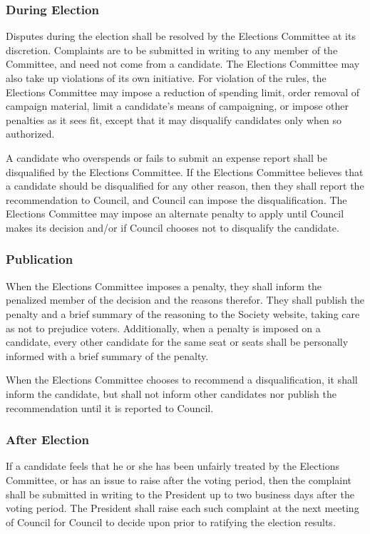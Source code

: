 \subsubsection{During Election}
Disputes during the election shall be resolved by the Elections Committee at its
discretion. Complaints are to be submitted in writing to any member of the
Committee, and need not come from a candidate. The Elections Committee may also
take up violations of its own initiative. For violation of the rules, the
Elections Committee may impose a reduction of spending limit, order removal of
campaign material, limit a candidate's means of campaigning, or impose other
penalties as it sees fit, except that it may disqualify candidates only when so
authorized.

A candidate who overspends or fails to submit an expense report shall be
disqualified by the Elections Committee. If the Elections Committee believes
that a candidate should be disqualified for any other reason, then they shall
report the recommendation to Council, and Council can impose the
disqualification. The Elections Committee may impose an alternate penalty to
apply until Council makes its decision and/or if Council chooses not to
disqualify the candidate.

\subsubsection{Publication}
When the Elections Committee imposes a penalty, they shall inform the penalized
member of the decision and the reasons therefor. They shall publish the penalty
and a brief summary of the reasoning to the Society website, taking care as not
to prejudice voters.  Additionally, when a penalty is imposed on a candidate,
every other candidate for the same seat or seats shall be personally informed
with a brief summary of the penalty.

When the Elections Committee chooses to recommend a disqualification, it shall
inform the candidate, but shall not inform other candidates nor publish the
recommendation until it is reported to Council.

\subsubsection{After Election}
If a candidate feels that he or she has been unfairly treated by the Elections
Committee, or has an issue to raise after the voting period, then the complaint
shall be submitted in writing to the President up to two business days after the
voting period. The President shall raise each such complaint at the next meeting
of Council for Council to decide upon prior to ratifying the election results.

